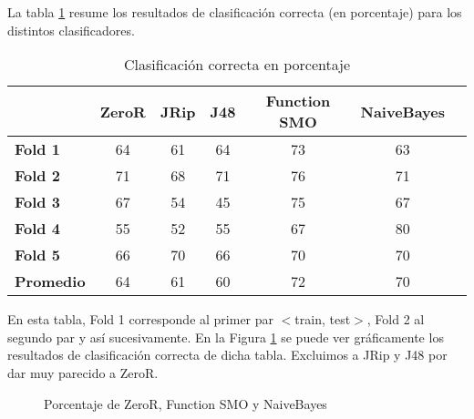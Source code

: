 La tabla \ref{class_corr_en_pct} resume los resultados de clasificación correcta (en porcentaje) para los distintos clasificadores.

\begin{table}[H]
\centering
\begin{tabular}{|l|c|c|c|c|c|c|}
\hline
\textbf{}  & \textbf{ZeroR} & \textbf{JRip} & \textbf{J48} & \textbf{Function SMO} & \textbf{NaiveBayes} \\ \hline
\textbf{Fold 1}  & 64 & 61 & 64 & 73 & 63 \\ \hline
\textbf{Fold 2}  & 71 & 68 & 71 & 76 & 71 \\ \hline
\textbf{Fold 3}  & 67 & 54 & 45 & 75 & 67 \\ \hline
\textbf{Fold 4}  & 55 & 52 & 55 & 67 & 80 \\ \hline
\textbf{Fold 5}  & 66 & 70 & 66 & 70 & 70 \\ \hline
\hline \hline
\textbf{Promedio} & 64 & 61 & 60 & 72 & 70 \\ \hline
\end{tabular}
\caption{Clasificación correcta en porcentaje}
\label{class_corr_en_pct}
\end{table}

En esta tabla, Fold 1 corresponde al primer par $<$train, test$>$, Fold 2 al segundo par y así sucesivamente. En la Figura \ref{porcentajexClasificador} se puede ver gráficamente los resultados de clasificación correcta de dicha tabla. Excluimos a JRip y J48 por dar muy parecido a ZeroR.

\begin{figure}[H]
\centering
{}
\caption{Porcentaje de ZeroR, Function SMO y NaiveBayes}
\label{porcentajexClasificador}
\end{figure}

